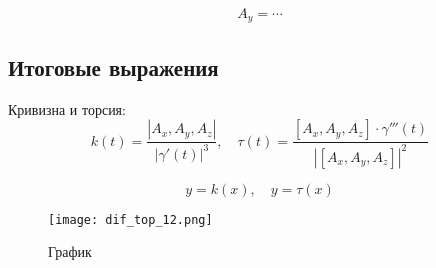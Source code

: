 \documentclass{article}
\begin{document}
        \[
        A_y = \cdots
        \]
        
        \subsection*{Итоговые выражения}
        Кривизна и торсия:
        \[
        k(t) = \frac{|A_x, A_y, A_z|}{|\gamma'(t)|^3}, \quad \tau(t) = \frac{[A_x, A_y, A_z] \cdot \gamma'''(t)}{|[A_x, A_y, A_z]|^2}
        \]
        
        \[
        y = k(x), \quad y = \tau(x)
        \]
        
        \begin{figure}[H]
            \centering
            \texttt{[image: dif\_top\_12.png]}
            \caption{График}
            \label{fig:my_label}
        \end{figure}
        
\end{document}
